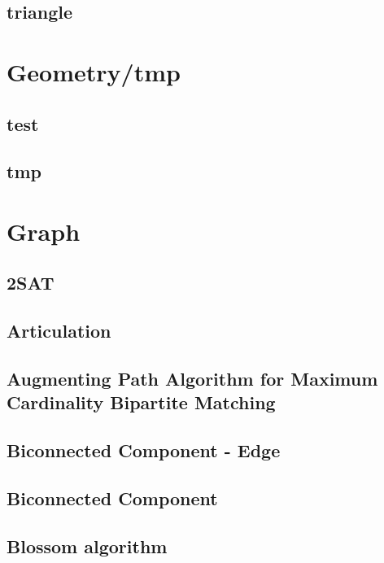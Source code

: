\documentclass[a4paper,5pt,twocolumn,titlepage]{article}
\begin{document}
\subsection{triangle}


\section{Geometry/tmp}
\subsection{test}

\subsection{tmp}


\section{Graph}
\subsection{2SAT}

\subsection{Articulation}

\subsection{Augmenting Path Algorithm for Maximum Cardinality Bipartite Matching}

\subsection{Biconnected Component - Edge}

\subsection{Biconnected Component}

\subsection{Blossom algorithm}

\end{document}
